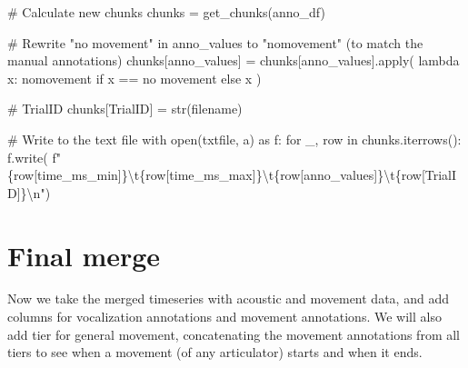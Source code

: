 \documentclass[
  letterpaper,
  DIV=11,
  numbers=noendperiod]{scrreprt}
\newenvironment{Shaded}{\begin{snugshade}}{\end{snugshade}}
\newcommand{\BuiltInTok}[1]{\textcolor[rgb]{0.00,0.23,0.31}{#1}}
\newcommand{\CharTok}[1]{\textcolor[rgb]{0.13,0.47,0.30}{#1}}
\newcommand{\CommentTok}[1]{\textcolor[rgb]{0.37,0.37,0.37}{#1}}
\newcommand{\ControlFlowTok}[1]{\textcolor[rgb]{0.00,0.23,0.31}{#1}}
\newcommand{\ImportTok}[1]{\textcolor[rgb]{0.00,0.46,0.62}{#1}}
\newcommand{\KeywordTok}[1]{\textcolor[rgb]{0.00,0.23,0.31}{#1}}
\newcommand{\NormalTok}[1]{\textcolor[rgb]{0.00,0.23,0.31}{#1}}
\newcommand{\OperatorTok}[1]{\textcolor[rgb]{0.37,0.37,0.37}{#1}}
\newcommand{\SpecialCharTok}[1]{\textcolor[rgb]{0.37,0.37,0.37}{#1}}
\newcommand{\SpecialStringTok}[1]{\textcolor[rgb]{0.13,0.47,0.30}{#1}}
\newcommand{\StringTok}[1]{\textcolor[rgb]{0.13,0.47,0.30}{#1}}
\begin{document}
\begin{Shaded}
\begin{Highlighting}[]
        \CommentTok{\# Calculate new chunks}
\NormalTok{        chunks }\OperatorTok{=}\NormalTok{ get\_chunks(anno\_df)}

        \CommentTok{\# Rewrite "no movement" in anno\_values to "nomovement" (to match the manual annotations)}
\NormalTok{        chunks[}\StringTok{\textquotesingle{}anno\_values\textquotesingle{}}\NormalTok{] }\OperatorTok{=}\NormalTok{ chunks[}\StringTok{\textquotesingle{}anno\_values\textquotesingle{}}\NormalTok{].}\BuiltInTok{apply}\NormalTok{(}
            \KeywordTok{lambda}\NormalTok{ x: }\StringTok{\textquotesingle{}nomovement\textquotesingle{}} \ControlFlowTok{if}\NormalTok{ x }\OperatorTok{==} \StringTok{\textquotesingle{}no movement\textquotesingle{}} \ControlFlowTok{else}\NormalTok{ x}
\NormalTok{        )}

        \CommentTok{\# TrialID}
\NormalTok{        chunks[}\StringTok{\textquotesingle{}TrialID\textquotesingle{}}\NormalTok{]  }\OperatorTok{=} \BuiltInTok{str}\NormalTok{(filename)}

        \CommentTok{\# Write to the text file}
        \ControlFlowTok{with} \BuiltInTok{open}\NormalTok{(txtfile, }\StringTok{\textquotesingle{}a\textquotesingle{}}\NormalTok{) }\ImportTok{as}\NormalTok{ f:}
            \ControlFlowTok{for}\NormalTok{ \_, row }\KeywordTok{in}\NormalTok{ chunks.iterrows():}
\NormalTok{                f.write(}
                    \SpecialStringTok{f"}\SpecialCharTok{\{}\NormalTok{row[}\StringTok{\textquotesingle{}time\_ms\_min\textquotesingle{}}\NormalTok{]}\SpecialCharTok{\}}\CharTok{\textbackslash{}t}\SpecialCharTok{\{}\NormalTok{row[}\StringTok{\textquotesingle{}time\_ms\_max\textquotesingle{}}\NormalTok{]}\SpecialCharTok{\}}\CharTok{\textbackslash{}t}\SpecialCharTok{\{}\NormalTok{row[}\StringTok{\textquotesingle{}anno\_values\textquotesingle{}}\NormalTok{]}\SpecialCharTok{\}}\CharTok{\textbackslash{}t}\SpecialCharTok{\{}\NormalTok{row[}\StringTok{\textquotesingle{}TrialID\textquotesingle{}}\NormalTok{]}\SpecialCharTok{\}}\CharTok{\textbackslash{}n}\SpecialStringTok{"}\NormalTok{)}
\end{Highlighting}
\end{Shaded}


\chapter{Final merge}\label{final-merge}

Now we take the merged timeseries with acoustic and movement data, and
add columns for vocalization annotations and movement annotations. We
will also add tier for general movement, concatenating the movement
annotations from all tiers to see when a movement (of any articulator)
starts and when it ends.
\end{document}
